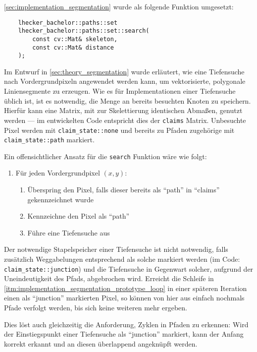 \autoref{sec:implementation_segmentation} wurde als folgende Funktion umgesetzt:
\begin{verbatim}
    lhecker_bachelor::paths::set
    lhecker_bachelor::paths::set::search(
        const cv::Mat& skeleton,
        const cv::Mat& distance
    );
\end{verbatim}

Im Entwurf in \autoref{sec:theory_segmentation} wurde erläutert, wie eine Tiefensuche nach Vordergrundpixeln angewendet werden kann, um vektorisierte, polygonale Liniensegmente zu erzeugen.
Wie es für Implementationen einer Tiefensuche üblich ist, ist es notwendig, die Menge an bereits besuchten Knoten zu speichern.
Hierfür kann eine Matrix, mit zur Skelettierung identischen Abmaßen, genutzt werden --- im entwickelten Code entspricht dies der \texttt{claims} Matrix.
Unbesuchte Pixel werden mit \texttt{claim\_state::none} und bereits zu Pfaden zugehörige mit \texttt{claim\_state::path} markiert.

Ein offensichtlicher Ansatz für die \texttt{search} Funktion wäre wie folgt:
\begin{enumerate}
    \item\label{itm:implementation_segmentation_prototype_loop} Für jeden Vordergrundpixel \((x,y)\):
    \begin{enumerate}[topsep=0pt]
        \item Überspring den Pixel, falls dieser bereits als \enquote{path} in \enquote{claims} gekennzeichnet wurde
        \item Kennzeichne den Pixel als \enquote{path}
        \item Führe eine Tiefensuche aus
    \end{enumerate}
\end{enumerate}

Der notwendige Stapelspeicher einer Tiefensuche ist nicht notwendig, falls zusätzlich Weggabelungen entsprechend als solche markiert werden (im Code: \texttt{claim\_state::junction}) und die Tiefensuche in Gegenwart solcher, aufgrund der Uneindeutigkeit des Pfads, abgebrochen wird.
Erreicht die Schleife in \autoref{itm:implementation_segmentation_prototype_loop} in einer späteren Iteration einen als \enquote{junction} markierten Pixel, so können von hier aus einfach nochmals Pfade verfolgt werden, bis sich keine weiteren mehr ergeben.

Dies löst auch gleichzeitig die Anforderung, Zyklen in Pfaden zu erkennen: Wird der Einstiegspunkt einer Tiefensuche als \enquote{junction} markiert, kann der Anfang korrekt erkannt und an diesen überlappend angeknüpft werden.

